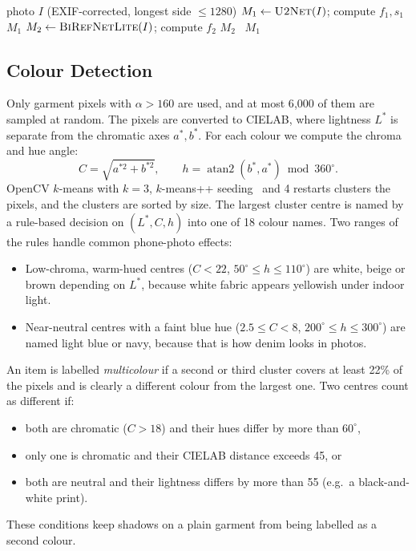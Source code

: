 \documentclass[conference]{IEEEtran}
\begin{document}
\begin{algorithm}[t]
\caption{Garment segmentation with fallback}
\label{alg:seg}
\begin{algorithmic}[1]
\Require photo $I$ (EXIF-corrected, longest side $\le 1280$)
\State $M_1 \gets \textsc{U2Net}(I)$; compute $f_1, s_1$
  \State \Return $M_1$
\EndIf
\State $M_2 \gets \textsc{BiRefNetLite}(I)$; compute $f_2$
 \Return $M_2$ \Else\ \Return $M_1$ \EndIf
\end{algorithmic}
\end{algorithm}

\subsection{Colour Detection}\label{sec:color}
Only garment pixels with $\alpha>160$ are used, and at most 6{,}000 of them are sampled at random. The pixels are converted to CIELAB, where lightness $L^*$ is separate from the chromatic axes $a^*,b^*$. For each colour we compute the chroma and hue angle:
\begin{equation}
  C = \sqrt{a^{*2}+b^{*2}}, \qquad h = \operatorname{atan2}(b^*, a^*) \bmod 360^\circ.
\end{equation}
OpenCV $k$-means with $k{=}3$, $k$-means++ seeding~\cite{arthur2007kmeanspp} and 4 restarts clusters the pixels, and the clusters are sorted by size. The largest cluster centre is named by a rule-based decision on $(L^*, C, h)$ into one of 18 colour names. Two ranges of the rules handle common phone-photo effects:
\begin{itemize}
  \item Low-chroma, warm-hued centres ($C<22$, $50^\circ\le h\le110^\circ$) are white, beige or brown depending on $L^*$, because white fabric appears yellowish under indoor light.
  \item Near-neutral centres with a faint blue hue ($2.5\le C<8$, $200^\circ\le h\le300^\circ$) are named light blue or navy, because that is how denim looks in photos.
\end{itemize}
An item is labelled \emph{multicolour} if a second or third cluster covers at least 22\% of the pixels and is clearly a different colour from the largest one. Two centres count as different if:
\begin{itemize}
  \item both are chromatic ($C>18$) and their hues differ by more than $60^\circ$,
  \item only one is chromatic and their CIELAB distance exceeds 45, or
  \item both are neutral and their lightness differs by more than 55 (e.g.\ a black-and-white print).
\end{itemize}
These conditions keep shadows on a plain garment from being labelled as a second colour.
\end{document}
